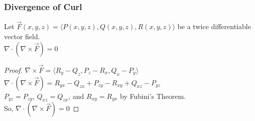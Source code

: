 \subsubsection{Divergence of Curl}
\begin{theorem}
	Let $\vec{F}(x,y,z)=\langle P(x,y,z), Q(x,y,z), R(x,y,z)\rangle$ be a twice differentiable vector field.\\
	$\nabla\cdot(\nabla\times\vec{F})=0$
\end{theorem}
\begin{proof}
	$\nabla\times\vec{F}=\langle R_y-Q_z, P_z-R_x, Q_x-P_y\rangle$\\
	$\nabla\cdot(\nabla\times\vec{F})=R_{yx}-Q_{zx}+P_{zy}-R_{xy}+Q_{xz}-P_{yz}$\\
	$P_{yz}=P_{zy}$, $Q_{xz}=Q_{zx}$, and $R_{xy}=R_{yx}$ by Fubini's Theorem.\\
	So, $\nabla\cdot(\nabla\times\vec{F})=0$
\end{proof}
